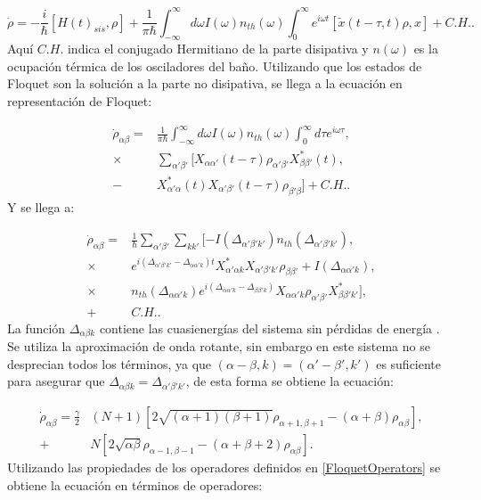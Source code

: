 \documentclass[a4paper,10pt]{report}
\begin{document}
\begin{equation}
\dot{\rho} = -\frac{i}{\hbar}[H(t)_{sis},\rho] + \frac{1}{\pi \hbar} \int_{-\infty}^\infty d\omega I(\omega)n_{th}(\omega)\int_0^\infty e^{i\omega t}[\tilde{x}(t-\tau,t)\rho,x] + C.H..
\end{equation}Aquí $C.H.$ indica el conjugado Hermitiano de la parte disipativa y $n(\omega)$ es la ocupación térmica de los osciladores del baño. Utilizando que los estados de Floquet son la solución a la parte no disipativa, se llega a la ecuación en representación de Floquet:

\begin{align*}
\dot{\rho}_{\alpha \beta} =& \frac{1}{\pi \hbar} \int_{-\infty}^\infty d\omega I(\omega)n_{th}(\omega) \int_0 ^{\infty} d\tau e^{i\omega \tau}, \\
 \times & \sum_{\alpha' \beta '} [X_{\alpha \alpha'}(t-\tau)\rho_{\alpha' \beta'}X^* _{\beta \beta'}(t),\\
 -& X^* _{\alpha' \alpha}(t) X_{\alpha' \beta'}(t-\tau)\rho_{\beta' \beta}] + C.H..
\end{align*} Y se llega a:

\begin{align*}
\dot{\rho}_{\alpha \beta} =& \frac{1}{\hbar} \sum_{\alpha' \beta'}\sum_{k k'}[-I(\Delta_{\alpha' \beta' k'}) n_{th} (\Delta_{\alpha' \beta' k'}),\\
\times & e^{i(\Delta_{\alpha' \beta' k'}-\Delta_{\alpha \alpha' k})t} X^*_{\alpha' \alpha k}X_{\alpha' \beta' k'}\rho_{\beta \beta'} + I(\Delta_{\alpha \alpha' k}),\\
\times & n_{th}(\Delta_{\alpha \alpha' k}) e^{i(\Delta_{\alpha \alpha' k}-\Delta_{\beta \beta' k})}X_{\alpha \alpha' k} \rho_{\alpha' \beta'}X^*_{\beta \beta' k'}],\\
+& C. H..  
\end{align*} La función $\Delta_{\alpha \beta k}$ contiene las cuasienergías del sistema sin pérdidas de energía \cite{HanngiDQS}. Se utiliza la aproximación de onda rotante, sin embargo en este sistema no se desprecian todos los términos, ya que $(\alpha-\beta,k)=(\alpha'-\beta',k')$ es suficiente para asegurar que $\Delta_{\alpha \beta k}=\Delta_{\alpha' \beta' k'}$, de esta forma se obtiene la ecuación:

\begin{align*}
\dot{\rho}_{\alpha \beta} = \frac{\gamma}{2}&(N+1)[2\sqrt{(\alpha+1)(\beta + 1)}\rho_{\alpha+1,\beta+1} - (\alpha + \beta)\rho_{\alpha \beta}],\\
+& N[2\sqrt{\alpha \beta}\rho_{\alpha-1,\beta-1} - (\alpha + \beta + 2)\rho_{\alpha \beta}].
\end{align*}Utilizando las propiedades de los operadores definidos en \ref{FloquetOperators} se obtiene la ecuación en términos de operadores:
\end{document}
